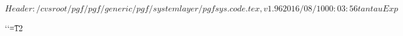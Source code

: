 %
%
%

\ProvidesPackageRCS[v\pgfversion] $Header: /cvsroot/pgf/pgf/generic/pgf/systemlayer/pgfsys.code.tex,v 1.96 2016/08/10 00:03:56 tantau Exp $




\def\pgfset{\pgfqkeys{/pgf}}

\newif\ifpgfpicture


%
% 
{\catcode`\catcode`\t=12\gdef\Pgf@geT#1pt{#1}}

\def\pgf@sys@tonumber#1{\expandafter\Pgf@geT\the#1}

\def\pgf@sys@bp@correct#1{#1=0.99627#1}

\def\pgf@sys@bp#1{%
  {%
    \pgf@x=#1\relax%
    \pgf@x=0.99627\pgf@x%
    \edef\temp{\expandafter\Pgf@geT\the\pgf@x\space}%
    \pgfutil@toks@\expandafter\expandafter\expandafter{\expandafter\pgfsysprotocol@currentprotocol\temp}%
    \xdef\pgfsysprotocol@currentprotocol{\the\pgfutil@toks@}%
  }%
}
\def\pgf@sys@pt#1{%
  {%
    \pgf@x=#1\relax%
    \edef\temp{\expandafter\Pgf@geT\the\pgf@x\space}%
    \pgfutil@toks@\expandafter\expandafter\expandafter{\expandafter\pgfsysprotocol@currentprotocol\temp}%
    \xdef\pgfsysprotocol@currentprotocol{\the\pgfutil@toks@}%
  }%
}


\newdimen\pgf@x
\newdimen\pgf@y
\newdimen\pgf@xa
\newdimen\pgf@ya
\newdimen\pgf@xb
\newdimen\pgf@yb
\newdimen\pgf@xc
\newdimen\pgf@yc

\newwrite\w@pgf@writea
\newread\r@pgf@reada
\let\pgfutil@inputcheck=\r@pgf@reada

\newcount\c@pgf@counta
\newcount\c@pgf@countb
\newcount\c@pgf@countc
\newcount\c@pgf@countd

\newtoks\t@pgf@toka
\newtoks\t@pgf@tokb
\newtoks\t@pgf@tokc

\let\pgfmath@x\pgf@x
\let\pgfmath@xa\pgf@xa
\let\pgfmath@xb\pgf@xb
\let\pgfmath@xc\pgf@xc

